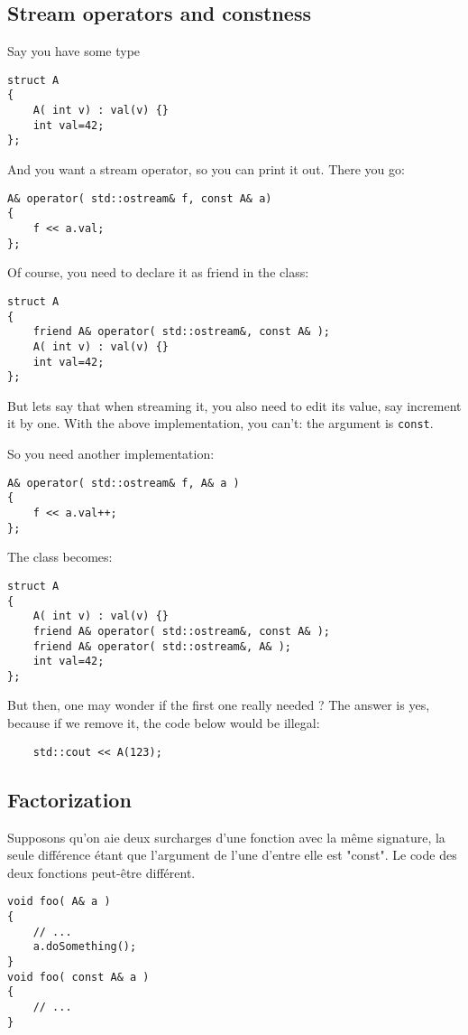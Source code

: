 \documentclass[11pt,a4paper]{article}
\begin{document}
\subsection{Stream operators and constness}

Say you have some type
\begin{lstlisting}
struct A
{
	A( int v) : val(v) {}
	int val=42;
};
\end{lstlisting}

And you want a stream operator, so you can print it out.
There you go:

\begin{lstlisting}
A& operator( std::ostream& f, const A& a)
{
	f << a.val;
};
\end{lstlisting}

Of course, you need to declare it as friend in the class:
\begin{lstlisting}
struct A
{
	friend A& operator( std::ostream&, const A& );
	A( int v) : val(v) {}
	int val=42;
};
\end{lstlisting}

But lets say that when streaming it, you also need to edit its value, say increment it by one.
With the above implementation, you can't: the argument is {\tt const}.

So you need another implementation:
\begin{lstlisting}
A& operator( std::ostream& f, A& a )
{
	f << a.val++;
};
\end{lstlisting}

The class becomes:
\begin{lstlisting}
struct A
{
	A( int v) : val(v) {}
	friend A& operator( std::ostream&, const A& );
	friend A& operator( std::ostream&, A& );
	int val=42;
};
\end{lstlisting}

But then, one may wonder if the first one really needed ?
The answer is yes, because if we remove it, the code below would be illegal:
\begin{lstlisting}
	std::cout << A(123);
\end{lstlisting}


\subsection{Factorization}
\label{ssec:facto1}

Supposons qu'on aie deux surcharges d'une fonction avec la même signature, la seule différence étant que l'argument de l'une d'entre elle est "const".
Le code des deux fonctions peut-être différent.
\begin{lstlisting}
void foo( A& a )
{
	// ...
	a.doSomething();
}
void foo( const A& a )
{
	// ...
}
\end{lstlisting}
\end{document}
